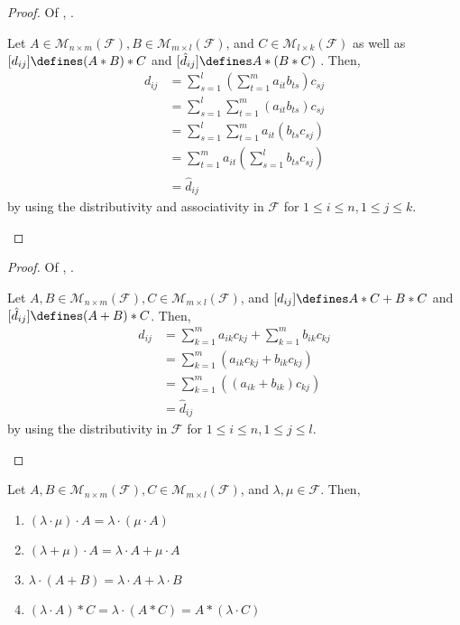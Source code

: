 \begin{proof}
	Of , .
	\begin{flushleft}
		Let $A\in\mathcal{M}_{n\times m}(\mathcal{F}), B\in\mathcal{M}_{m\times l}(\mathcal{F})$,
		and $C\in\mathcal{M}_{l\times k}(\mathcal{F})$ as well as
		$[d_{ij}]\defines(A * B) * C$ and $[\hat{d}_{ij}]\defines A * (B * C)$ \cite[p.43]{liesenMehrmann2015}. Then,
		\begin{align*}
			d_{ij} & = \sum_{s=1}^l\left(\sum_{t=1}^m a_{it}b_{ts}\right)c_{sj}   \\
			       & = \sum_{s=1}^l \sum_{t=1}^m (a_{it}b_{ts})c_{sj}             \\
			       & = \sum_{s=1}^l \sum_{t=1}^m a_{it}(b_{ts}c_{sj})             \\
			       & = \sum_{t=1}^m a_{it} \left(\sum_{s=1}^l b_{ts}c_{sj}\right) \\
			       & = \hat{d}_{ij}
		\end{align*}
		by using the distributivity and associativity in $\mathcal{F}$ for
		$1 \leq i \leq n, 1 \leq j \leq k$.
	\end{flushleft}
\end{proof}

\begin{proof}
	Of , .
	\begin{flushleft}
		Let $A,B\in\mathcal{M}_{n\times m}(\mathcal{F}), C\in\mathcal{M}_{m\times l}(\mathcal{F})$,
		and $[d_{ij}]\defines A * C + B * C$ and $[\hat{d}_{ij}]\defines (A + B) * C$. Then,
		\begin{align*}
			d_{ij} & = \sum_{k=1}^m a_{ik}c_{kj} +\sum_{k=1}^m b_{ik}c_{kj} \\
			       & = \sum_{k=1}^m \left(a_{ik}c_{kj}+b_{ik}c_{kj}\right)  \\
			       & = \sum_{k=1}^m \left((a_{ik}+b_{ik})c_{kj}\right)      \\
			       & = \hat{d}_{ij}
		\end{align*}
		by using the distributivity in $\mathcal{F}$ for
		$1 \leq i \leq n, 1 \leq j \leq l$.
	\end{flushleft}
\end{proof}

\begin{lemma}\label{lemma-scalar-multiplication}
	Let $A,B\in\mathcal{M}_{n\times m}(\mathcal{F}), C\in\mathcal{M}_{m\times l}(\mathcal{F})$,
	and $\lambda,\mu\in\mathcal{F}$. Then,
	\begin{enumerate}
		\item $(\lambda \cdot \mu) \cdot A = \lambda \cdot (\mu \cdot A)$
		\item $(\lambda + \mu) \cdot A = \lambda \cdot A + \mu \cdot A$
		\item $\lambda \cdot (A + B) = \lambda \cdot A + \lambda \cdot B$
		\item $(\lambda \cdot A) * C = \lambda \cdot (A * C) = A * (\lambda \cdot C)$
	\end{enumerate}
\end{lemma}

